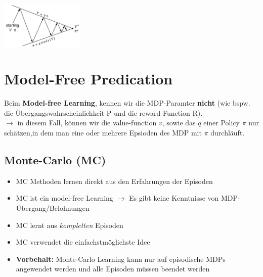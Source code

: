 \documentclass{article}
\newenvironment{Figure}
	{\par\medskip\noindent\minipage{\linewidth}}
	{\endminipage\par\medskip}
\theoremstyle{merke}
\theoremstyle{definition}
\begin{document}
        \begin{Figure}
            \centering
            \includegraphics[width=150px]{img/greedyPolicyIteration.png}
                \label{fig:Abbildung der Policy Iteration}
        \end{Figure}

    \section{Model-Free Predication}
    Beim \textbf{Model-free Learning}, kennen wir die MDP-Paramter \textbf{nicht} (wie bspw. die Übergangswahrscheinlichkeit P und die reward-Function R).\\
    $\rightarrow$ in diesem Fall, können wir die value-function $v$, sowie das $q$ einer Policy $\pi$ nur schätzen,in dem man eine oder mehrere Epsioden des MDP mit $\pi$ durchläuft.

        \subsection{Monte-Carlo (MC)}
        \begin{itemize}
            \item MC Methoden lernen direkt aus den Erfahrungen der Episoden
            \item MC ist ein model-free Learning $\rightarrow$ Es gibt keine Kenntnisse von MDP-Übergang/Belohnungen
            \item MC lernt aus \textit{kompletten} Episoden
            \item MC verwendet die einfachstmöglichste Idee
            \item \textbf{Vorbehalt:} Monte-Carlo Learning kann nur auf episodische MDPs angewendet werden und alle Episoden müssen beendet werden
        \end{itemize}
\end{document}
